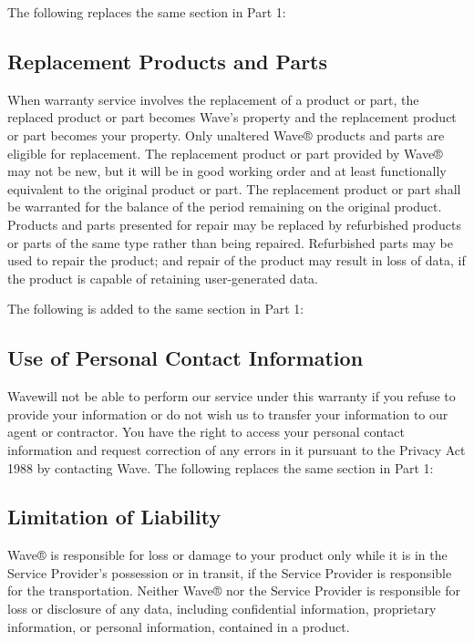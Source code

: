 \documentclass[letterpaper,10pt,english]{sphinxmanual}
\begin{document}
The following replaces the same section in Part 1:


\subsection{Replacement Products and Parts}
\label{\detokenize{part2:replacement-products-and-parts}}
When warranty service involves the replacement of a product or part, the replaced product or part becomes Wave’s property and the replacement product or part becomes your property. Only unaltered Wave® products and parts are eligible for replacement. The replacement product or part provided by Wave® may not be new, but it will be in good working order and at least functionally equivalent to the original product or part. The replacement product or part shall be warranted for the balance of the period remaining on the original product. Products and parts presented for repair may be replaced by refurbished products or parts of the same type rather than being repaired. Refurbished parts may be used to repair the product; and repair of the product may result in loss of data, if the product is capable of retaining user-generated data.

The following is added to the same section in Part 1:


\subsection{Use of Personal Contact Information}
\label{\detokenize{part2:use-of-personal-contact-information}}
Wavewill not be able to perform our service under this warranty if you refuse to provide your information or do not wish us to transfer your information to our agent or contractor. You have the right to access your personal contact information and request correction of any errors in it pursuant to the Privacy Act 1988 by contacting Wave. The following replaces the same section in Part 1:


\subsection{Limitation of Liability}
\label{\detokenize{part2:limitation-of-liability}}
Wave® is responsible for loss or damage to your product only while it is in the Service Provider’s possession or in transit, if the Service Provider is responsible for the transportation. Neither Wave® nor the Service Provider is responsible for loss or disclosure of any data, including confidential information, proprietary information, or personal information, contained in a product.
\end{document}
